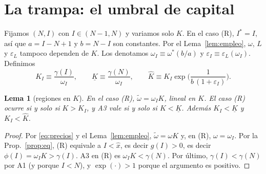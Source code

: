 \documentclass[11pt,a4paper]{article}
\numberwithin{equation}{section}
\theoremstyle{definition}
\theoremstyle{plain}
\newtheorem{lema}[definicion]{Lema}
\theoremstyle{remark}
\newcommand{\Is}{I^{*}}
\newcommand{\Kl}{\underline K}
\newcommand{\Kh}{\hat K}
\newcommand{\eps}{\varepsilon}
\newcommand{\wt}{\tilde\omega}
\begin{document}
\section{La trampa: el umbral de capital}\label{sec:trampa}

Fijamos $(N,I)$ con $I\in(N-1,N)$ y variamos solo $K$. En el caso (R), $\Is=I$, así que $a=I-N+1$ y $b=N-I$ son
constantes. Por el Lema~\ref{lem:empleo}, $\omega$, $L$ y $\eps_L$ tampoco dependen de $K$. Los denotamos
$\omega_I\equiv\omega^*(b/a)$ y $\eps_I\equiv\eps_L(\omega_I)$. Definimos
\begin{equation}\label{eq:umbrales}
  K_I\equiv\frac{\gamma(I)}{\omega_I},\qquad
  \Kl\equiv\frac{\gamma(N)}{\omega_I},\qquad
  \Kh\equiv K_I\exp\!\Big(\frac{1}{b\,(1+\eps_I)}\Big).
\end{equation}

\begin{lema}[regiones en $K$]\label{lem:regiones}
En el caso (R), $\wt=\omega_I K$, lineal en $K$. El caso (R) ocurre si y solo si $K>K_I$, y \textsf{A3} vale si y
solo si $K<\Kl$. Además $K_I<\Kl$ y $K_I<\Kh$.
\end{lema}
\begin{proof}
Por \eqref{eq:precios} y el Lema~\ref{lem:empleo}, $\wt=\omega K$ y, en (R), $\omega=\omega_I$. Por la
Prop.~\ref{prop:eq}, (R) equivale a $I<\hat x$, es decir $g(I)>0$, es decir $\phi(I)=\omega_IK>\gamma(I)$. \textsf{A3}
en (R) es $\omega_IK<\gamma(N)$. Por último, $\gamma(I)<\gamma(N)$ por \textsf{A1} (y porque $I<N$), y
$\exp(\cdot)>1$ porque el argumento es positivo.
\end{proof}
\end{document}
